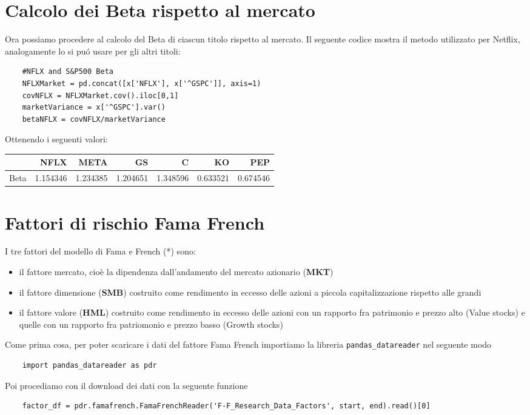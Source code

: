 \documentclass{report}
\begin{document}
\section{Calcolo dei Beta rispetto al mercato}
Ora possiamo procedere al calcolo del Beta di ciascun titolo rispetto al mercato. Il seguente codice mostra il metodo utilizzato per Netflix, analogamente lo si puó usare per gli altri titoli:
\begin{lstlisting}
    #NFLX and S&P500 Beta
    NFLXMarket = pd.concat([x['NFLX'], x['^GSPC']], axis=1)
    covNFLX = NFLXMarket.cov().iloc[0,1]
    marketVariance = x['^GSPC'].var()
    betaNFLX = covNFLX/marketVariance
\end{lstlisting}
Ottenendo i seguenti valori: 

\begin{tabular}{lrrrrrr}
\toprule
{} &     NFLX &     META &      GS &        C &       KO &      PEP \\
\midrule
Beta &  1.154346 &  1.234385 &  1.204651 &  1.348596 &  0.633521 &  0.674546 \\

\bottomrule
\end{tabular}

\section{Fattori di rischio Fama French}

I tre fattori del modello di Fama e French (*) sono:
\begin{itemize}[leftmargin=30pt, rightmargin=2cm]
\item il fattore mercato, cioè la dipendenza dall'andamento del mercato azionario (\textbf{MKT})
\item il fattore dimensione (\textbf{SMB}) costruito come rendimento in eccesso delle azioni a piccola capitalizzazione rispetto alle grandi
\item il fattore valore (\textbf{HML}) costruito come rendimento in eccesso delle azioni con un rapporto fra patrimonio e prezzo alto (Value stocks) e quelle con un rapporto fra patriomonio e prezzo basso (Growth stocks)
\end{itemize}
Come prima cosa, per poter scaricare i dati del fattore Fama French importiamo la libreria \lstinline{pandas_datareader} nel seguente modo
\begin{lstlisting}
    import pandas_datareader as pdr
\end{lstlisting}
Poi procediamo con il download dei dati con la seguente funzione
\begin{lstlisting}
    factor_df = pdr.famafrench.FamaFrenchReader('F-F_Research_Data_Factors', start, end).read()[0]
\end{lstlisting}
\end{document}
